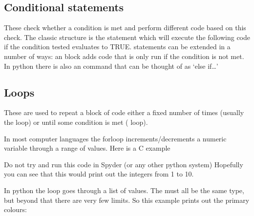 \documentclass[letterpaper,10pt,english]{jupyterBook}
\begin{document}
\subsection{Conditional statements}
\label{\detokenize{ProgInPython:conditional-statements}}
\sphinxAtStartPar
These check whether a condition is met and perform different code based on this check. The classic structure is the  statement which will execute the following code if the condition tested evaluates to TRUE.  statements can be extended in a number of ways: an  block adds code that is only run if the condition is not met. In python there is also an  command that can be thought of as ‘else if…’


\subsection{Loops}
\label{\detokenize{ProgInPython:loops}}
\sphinxAtStartPar
These are used to repeat a block of code either a fixed number of times (usually the  loop) or until some condition is met ( loop).

\sphinxAtStartPar
In most computer languages the for\sphinxhyphen{}loop increments/decrements a numeric variable through a range of values. Here is a C example

\begin{sphinxVerbatim}[commandchars=\\\{\}]
\end{sphinxVerbatim}

\sphinxAtStartPar
Do not try and run this code in Spyder (or any other python system)  Hopefully you can see that this would print out the integers from 1 to 10.

\sphinxAtStartPar
In python the loop goes through a list of values. The must all be the same type, but beyond that there are very few limits. So this example prints out the primary colours:
\end{document}
